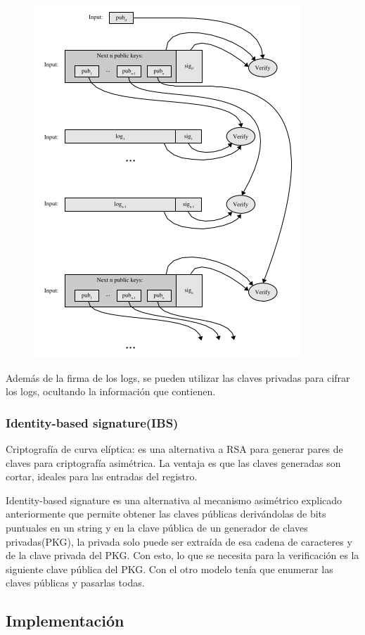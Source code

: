 \begin{figure}[H]
\centering
\includegraphics[scale=0.4]{imagenes/PublicKeyVerification.png}
\end{figure}
  
Además de la firma de los logs, se pueden utilizar las claves privadas para cifrar los logs, ocultando la información que contienen.
\subsubsection{Identity-based signature(IBS)}
Criptografía de curva elíptica: es una alternativa a RSA para generar pares de claves para criptografía asimétrica. La ventaja es que las claves generadas son cortar, ideales para las entradas del registro.

Identity-based signature es una alternativa al mecanismo asimétrico explicado anteriormente que permite obtener las claves públicas derivándolas de bits puntuales en un string y en la clave pública de un generador de claves privadas(PKG), la privada solo puede ser extraída de esa cadena de caracteres y de la clave privada del PKG. Con esto, lo que se necesita para la verificación es la siguiente clave pública del PKG. Con el otro modelo tenía que enumerar las claves públicas y pasarlas todas.
\subsection{Implementación}
